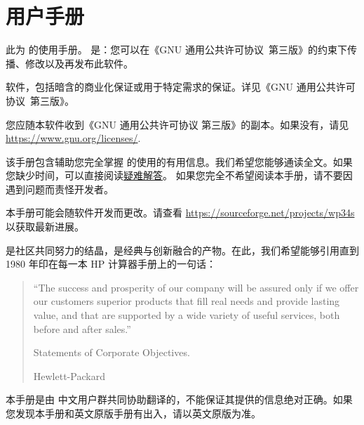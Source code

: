 
\chapter{\wpx 用户手册}

此为 \wpx 的使用手册。 \wpx 是：您可以在《GNU 通用公共许可协议~第三版》的约束下传播、修改以及再发布此软件。

\wpx 软件，包括暗含的商业化保证或用于特定需求的保证。详见《GNU 通用公共许可协议~第三版》。

您应随本软件收到《GNU 通用公共许可协议 第三版》的副本。如果没有，请见\url{https://www.gnu.org/licenses/}.

该手册包含辅助您完全掌握 \wpx 的使用的有用信息。我们希望您能够通读全文。如果您缺少时间，可以直接阅读\hyperref[chapter:troubleshooting]{疑难解答}。
如果您完全不希望阅读本手册，请不要因遇到问题而责怪开发者。

本手册可能会随软件开发而更改。请查看 \url{https://sourceforge.net/projects/wp34s} 以获取最新进展。

\wpx 是社区共同努力的结晶，是经典与创新融合的产物。在此，我们希望能够引用直到 1980 年印在每一本 HP 计算器手册上的一句话：

\begin{quote}
``The success and prosperity of our company will be assured only if we offer our 
customers superior products that fill real needs and provide lasting value, and 
that are supported by a wide variety of useful services, both before and after 
sales.''

\begin{flushright}
Statements of Corporate Objectives.

Hewlett-Packard
\end{flushright}
\end{quote}

本手册是由 \wpx 中文用户群共同协助翻译的，不能保证其提供的信息绝对正确。如果您发现本手册和英文原版手册有出入，请以英文原版为准。
